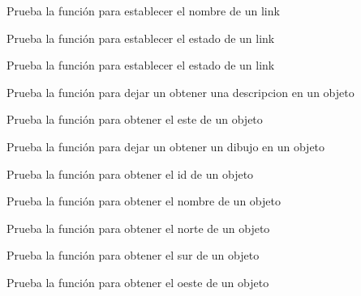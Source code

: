 \begin{DoxyRefList}
Prueba la función para establecer el nombre de un link  
\item[\label{test__test000193}%
\Hypertarget{test__test000193}%
Member \hyperlink{link__test_8h_a315ea19cd24434d2153b5df9f372a561}{test2\+\_\+link\+\_\+set\+\_\+status} ()]Prueba la función para establecer el estado de un link 

Prueba la función para establecer el estado de un link  
\item[\label{test__test000083}%
\Hypertarget{test__test000083}%
Member \hyperlink{object__test_8c_a35d9a40796133791c157c044ea1cef85}{test2\+\_\+object\+\_\+get\+\_\+description} ()]Prueba la función para dejar un obtener una descripcion en un objeto  
\item[\label{test__test000069}%
\Hypertarget{test__test000069}%
Member \hyperlink{object__test_8c_a0af301322234ef610275643ea846ec67}{test2\+\_\+object\+\_\+get\+\_\+east} ()]Prueba la función para obtener el este de un objeto  
\item[\label{test__test000079}%
\Hypertarget{test__test000079}%
Member \hyperlink{object__test_8c_a986fccb3aa7593b75b043547e9e22ebb}{test2\+\_\+object\+\_\+get\+\_\+gdesc} ()]Prueba la función para dejar un obtener un dibujo en un objeto  
\item[\label{test__test000073}%
\Hypertarget{test__test000073}%
Member \hyperlink{object__test_8c_a1ff250f0f43297f57fcce1f3a6ae490b}{test2\+\_\+object\+\_\+get\+\_\+id} ()]Prueba la función para obtener el id de un objeto  
\item[\label{test__test000060}%
\Hypertarget{test__test000060}%
Member \hyperlink{object__test_8c_abdfafbc7b8588d3dcdb05fd2beb2397e}{test2\+\_\+object\+\_\+get\+\_\+name} ()]Prueba la función para obtener el nombre de un objeto  
\item[\label{test__test000065}%
\Hypertarget{test__test000065}%
Member \hyperlink{object__test_8c_a098d0c4e35b24e3b126575e47c76e523}{test2\+\_\+object\+\_\+get\+\_\+north} ()]Prueba la función para obtener el norte de un objeto  
\item[\label{test__test000067}%
\Hypertarget{test__test000067}%
Member \hyperlink{object__test_8c_a84bb6c22cdec27962fe5a6b81e41010b}{test2\+\_\+object\+\_\+get\+\_\+south} ()]Prueba la función para obtener el sur de un objeto  
\item[\label{test__test000071}%
\Hypertarget{test__test000071}%
Member \hyperlink{object__test_8c_a3e8525c0760af6b2bed97b3e81592fa9}{test2\+\_\+object\+\_\+get\+\_\+west} ()]Prueba la función para obtener el oeste de un objeto  

\end{DoxyRefList}

